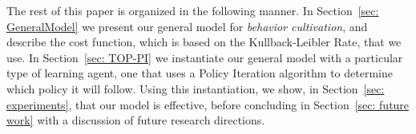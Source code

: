 The rest of this paper is organized in the following manner. In Section~\ref{sec: GeneralModel} we
present our general model for \emph{behavior cultivation}, and describe the cost function, which is based on the Kullback-Leibler Rate, that we use.  In Section~\ref{sec: TOP-PI} we instantiate our general model with a particular type of learning agent, one that uses a Policy Iteration algorithm to determine which policy it will follow. Using this instantiation, we show, in Section~\ref{sec: experiments},  that our model is effective, before concluding in Section~\ref{sec: future work} with a discussion of future research directions.



